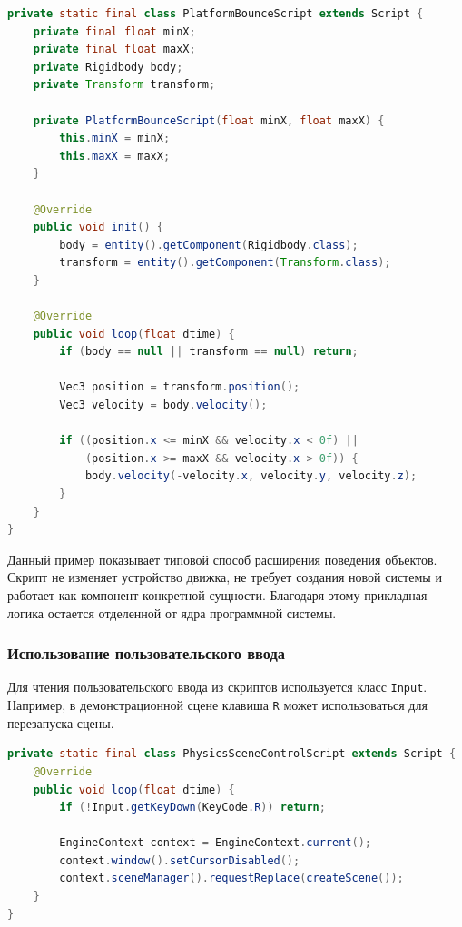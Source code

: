 \begin{lstlisting}[language=Java,caption={Пример пользовательского скрипта движения платформы}]
private static final class PlatformBounceScript extends Script {
    private final float minX;
    private final float maxX;
    private Rigidbody body;
    private Transform transform;

    private PlatformBounceScript(float minX, float maxX) {
        this.minX = minX;
        this.maxX = maxX;
    }

    @Override
    public void init() {
        body = entity().getComponent(Rigidbody.class);
        transform = entity().getComponent(Transform.class);
    }

    @Override
    public void loop(float dtime) {
        if (body == null || transform == null) return;

        Vec3 position = transform.position();
        Vec3 velocity = body.velocity();

        if ((position.x <= minX && velocity.x < 0f) ||
            (position.x >= maxX && velocity.x > 0f)) {
            body.velocity(-velocity.x, velocity.y, velocity.z);
        }
    }
}
\end{lstlisting}

Данный пример показывает типовой способ расширения поведения объектов. Скрипт не изменяет устройство движка, не требует создания новой системы и работает как компонент конкретной сущности. Благодаря этому прикладная логика остается отделенной от ядра программной системы.

\subsubsection{Использование пользовательского ввода}

Для чтения пользовательского ввода из скриптов используется класс \texttt{Input}. Например, в демонстрационной сцене клавиша \texttt{R} может использоваться для перезапуска сцены.

\begin{lstlisting}[language=Java,caption={Пример обработки нажатия клавиши}]
private static final class PhysicsSceneControlScript extends Script {
    @Override
    public void loop(float dtime) {
        if (!Input.getKeyDown(KeyCode.R)) return;

        EngineContext context = EngineContext.current();
        context.window().setCursorDisabled();
        context.sceneManager().requestReplace(createScene());
    }
}
\end{lstlisting}

